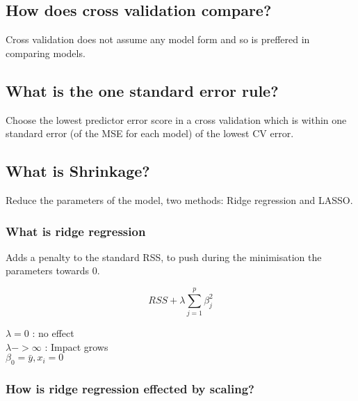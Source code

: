 \documentclass[11pt]{scrartcl} %
\begin{document}
\subsection{How does cross validation compare?}

Cross validation does not assume any model form and so is preffered in comparing models.

\subsection{What is the one standard error rule?}

Choose the lowest predictor error score in a cross validation which is within one standard error (of the MSE for each model)
of the lowest CV error.

\subsection{What is Shrinkage?}

Reduce the parameters of the model, two methods: Ridge regression and LASSO.

\subsubsection{What is ridge regression}

Adds a penalty to the standard RSS, to push during the minimisation the parameters towards 0.

\begin{equation}
	RSS + \lambda \sum^p_{j=1}{\beta^2_j}
\end{equation}

\(\lambda =0\) : no effect\\
\(\lambda ->\infty \) : Impact grows\\
\(\beta_0 = \bar{y},x_i=0\) 

\subsubsection{How is ridge regression effected by scaling?}



\end{document}

